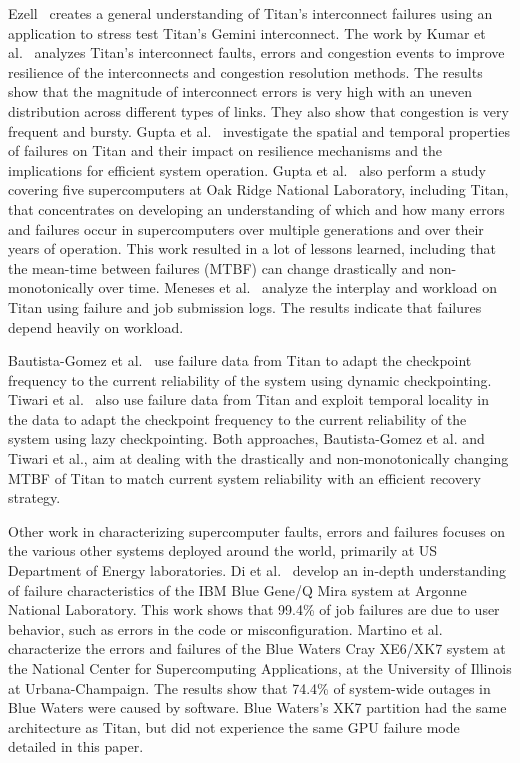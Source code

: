 Ezell~\cite{ezell2013} creates a general understanding of Titan's interconnect failures using an application to stress test Titan's Gemini interconnect.
%
The work by Kumar et al.~\cite{kumar18understanding} analyzes Titan's interconnect faults, errors and congestion events to improve resilience of the interconnects and congestion resolution methods. The results show that the magnitude of interconnect errors is very high with an uneven distribution across different types of links. They also show that congestion is very frequent and bursty.
%
Gupta et al.~\cite{7266836} investigate the spatial and temporal properties of failures on Titan and their impact on resilience mechanisms and the implications for efficient system operation.
%
Gupta et al.~\cite{gupta17failures} also perform a study covering five supercomputers at Oak Ridge National Laboratory, including Titan, that concentrates on developing an understanding of which and how many errors and failures occur in supercomputers over multiple generations and over their years of operation. This work resulted in a lot of lessons learned, including that the mean-time between failures (MTBF) can change drastically and non-monotonically over time.
%
Meneses et al.~\cite{Meneses15Analyzing} analyze the interplay and workload on Titan using failure and job submission logs. The results indicate that failures depend heavily on workload.

Bautista-Gomez et al.~\cite{bautista-gomez16reducing} use failure data from Titan to adapt the checkpoint frequency to the current reliability of the system using dynamic checkpointing.
%
Tiwari et al.~\cite{6903564} also use failure data from Titan and exploit temporal locality in the data to adapt the checkpoint frequency to the current reliability of the system using lazy checkpointing.
%
Both approaches, Bautista-Gomez et al. and Tiwari et al., aim at dealing with the drastically and non-monotonically changing MTBF of Titan to match current system reliability with an efficient recovery strategy.

Other work in characterizing supercomputer faults, errors and failures focuses on the various other systems deployed around the world, primarily at US Department of Energy laboratories.
%
Di et al.~\cite{8809553} develop an in-depth understanding of failure characteristics of the IBM Blue Gene/Q Mira system at Argonne National Laboratory. This work shows that 99.4\% of job failures are due to user behavior, such as errors in the code or misconfiguration. Martino et al.~\cite{6903615} characterize the errors and failures of the Blue Waters Cray XE6/XK7 system at the National Center for Supercomputing Applications, at the University of Illinois at Urbana-Champaign. The results show that 74.4\% of system-wide outages in Blue Waters were caused by software. Blue Waters's XK7 partition had the same architecture as Titan, but did not experience the same GPU failure mode detailed in this paper.
